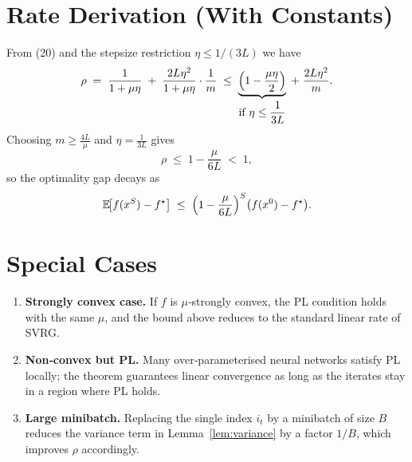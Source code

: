 \documentclass{article}
\newcommand{\EE}{\mathbb{E}}
\begin{document}
\section*{Rate Derivation (With Constants)}
From (20) and the stepsize restriction $\eta\le 1/(3L)$ we have
\[
\rho\;=\;\frac{1}{1+\mu\eta}
        \;+\;\frac{2L\eta^{2}}{1+\mu\eta}\cdot\frac{1}{m}
\;\le\;
\underbrace{\Bigl(1-\frac{\mu\eta}{2}\Bigr)}_{\displaystyle\text{if }\eta\le\frac{1}{3L}}
\;+\;\frac{2L\eta^{2}}{m}.
\]
Choosing $m\ge \frac{4L}{\mu}$ and $\eta=\frac{1}{3L}$ gives
\[
\rho\;\le\;1-\frac{\mu}{6L} \;<\;1,
\]
so the optimality gap decays as
\[
\EE\!\bigl[f(x^{S})-f^{\star}\bigr]\;\le\;
\Bigl(1-\frac{\mu}{6L}\Bigr)^{S}\bigl(f(x^{0})-f^{\star}\bigr).
\]

\section*{Special Cases}
\begin{enumerate}[leftmargin=*]
\item \textbf{Strongly convex case.} If $f$ is $\mu$‑strongly convex, the PL condition holds with the same $\mu$, and the bound above reduces to the standard linear rate of SVRG.
\item \textbf{Non‑convex but PL.} Many over‑parameterised neural networks satisfy PL locally; the theorem guarantees linear convergence as long as the iterates stay in a region where PL holds.
\item \textbf{Large minibatch.} Replacing the single index $i_t$ by a minibatch of size $B$ reduces the variance term in Lemma~\ref{lem:variance} by a factor $1/B$, which improves $\rho$ accordingly.
\end{enumerate}
\end{document}
